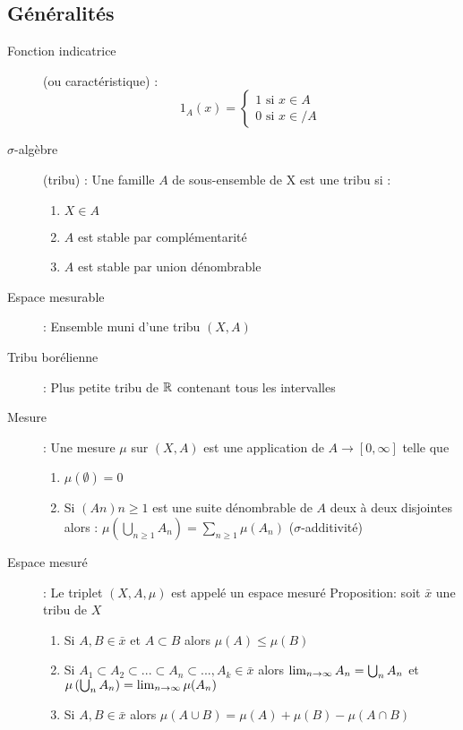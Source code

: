 \subsection{Généralités}
\begin{description}
\item[Fonction indicatrice] (ou caractéristique) : 
    \[1_A(x)=
    \begin{cases}
        1\textrm{ si }x \in A\\
        0\textrm{ si }x \in
    / A
    \end{cases}
    \]
\item[$\sigma$-algèbre] (tribu) : Une famille $A$ de sous-ensemble de X est une tribu si :
    \begin{enumerate}
        \item $X \in A$
        \item $A$ est stable par complémentarité
        \item $A$ est stable par union dénombrable
    \end{enumerate}
\item[Espace mesurable] : Ensemble muni d’une tribu $(X, A)$
\item[Tribu borélienne] : Plus petite tribu de $\mathbb{R}$ contenant tous les intervalles
\item[Mesure] : Une mesure $\mu$ sur $(X, A)$ est une application de $A \rightarrow [0, \infty]$ telle que
    \begin{enumerate}
        \item $\mu(\emptyset) = 0$
        \item Si $(A n ) n\ge 1$ est une suite dénombrable de $A$ deux à deux disjointes alors :
        $\mu\left(\bigcup_{n\ge 1} A_n\right) =
        \sum_{n\ge 1}\mu(A_n)$
        ($\sigma$-additivité)
    \end{enumerate}
\item[Espace mesuré] : Le triplet $(X, A, \mu)$ est appelé un espace mesuré
Proposition: soit $\bar x$ une tribu de $X$
    \begin{enumerate}
        \item Si $A, B \in \bar x$ et $A \subset B$ alors $\mu(A) \le \mu(B)$
        \item Si $A_1 \subset A_2 \subset ... \subset A_n \subset ..., A_k \in \bar x$
        alors
        $\lim_{n\rightarrow\infty}A_n = \bigcup_n A_n$ et $\mu\left(\bigcup_n A_n \right) = \lim_{n\rightarrow\infty}\mu(A_n)$
        \item Si $A, B \in \bar x$
        alors
        $\mu(A \cup B) = \mu(A) + \mu(B) - \mu(A \cap B)$

\end{enumerate}
\end{description}

